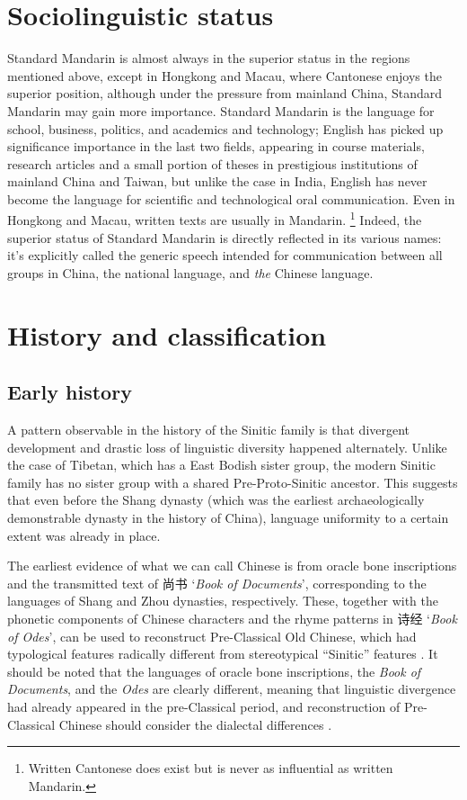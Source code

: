 \documentclass[UTF8, a4paper, oneside, scheme=plain, 12pt]{ctexrep}
\newcommand*{\citepages}[1]{pp.~{#1}}
\newcommand{\work}[1]{\textit{#1}}
\newcommand{\translate}[1]{`#1'}
\begin{document}
\section{Sociolinguistic status}

Standard Mandarin is almost always in the superior status 
in the regions mentioned above,
except in Hongkong and Macau, 
where Cantonese enjoys the superior position,
although under the pressure from mainland China, 
Standard Mandarin may gain more importance.
Standard Mandarin is the language for school, business, politics, 
and academics and technology; 
English has picked up significance importance in the last two fields,
appearing in course materials, research articles and a small portion of theses 
in prestigious institutions of mainland China and Taiwan,
but unlike the case in India,
English has never become the language
for scientific and technological oral communication.
Even in Hongkong and Macau, 
written texts are usually in Mandarin.%
\footnote{
    Written Cantonese does exist but is never as influential as written Mandarin.
}
Indeed, the superior status of Standard Mandarin is directly reflected in its various names: 
it's explicitly called the generic speech intended for 
communication between all groups in China, 
the national language, 
and \emph{the} Chinese language.

\section{History and classification}

\subsection{Early history}

A pattern observable in the history of the Sinitic family is that divergent development and drastic loss of linguistic diversity happened alternately.
Unlike the case of Tibetan, which has a East Bodish sister group,
the modern Sinitic family has no sister group with a shared Pre-Proto-Sinitic ancestor.
This suggests that even before the Shang dynasty (which was the earliest archaeologically demonstrable dynasty in the history of China),
language uniformity to a certain extent was already in place.

The earliest evidence of what we can call Chinese is from 
oracle bone inscriptions and the transmitted text of 尚书 \translate{\work{Book of Documents}},
corresponding to the languages of Shang and Zhou dynasties, respectively.
These, together with the phonetic components of Chinese characters
and the rhyme patterns in 诗经 \translate{\work{Book of Odes}},
can be used to reconstruct Pre-Classical Old Chinese,
which had typological features radically different from stereotypical ``Sinitic'' features
\citep{baxter2014old}.
It should be noted that the languages of oracle bone inscriptions,
the \work{Book of Documents}, and the \work{Odes} are clearly different,
meaning that linguistic divergence had already appeared in the pre-Classical period,
and reconstruction of Pre-Classical Chinese should consider the dialectal differences
\citep[\citepages{478-9}]{harbsmeier2016irrefutable}.
\end{document}

